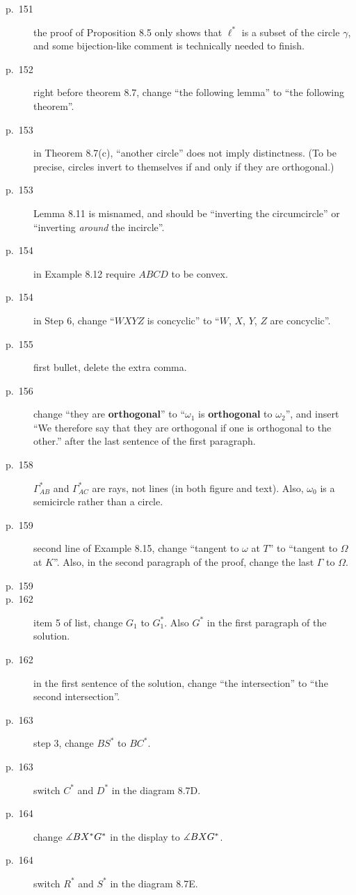 \documentclass[11pt]{scrartcl}
\begin{document}
\begin{description}
\item[p.\  151] the proof of Proposition 8.5 only shows that $\ell^\ast$ is a subset of the circle
  $\gamma$, and some bijection-like comment is technically needed to finish.
\item[p.\  152] right before theorem 8.7,
  change ``the following lemma'' to ``the following theorem''.
\item[p.\  153] in Theorem 8.7(c), ``another circle'' does not imply distinctness.
  (To be precise, circles invert to themselves if and only if they are orthogonal.)
\item[p.\  153] Lemma 8.11 is misnamed, and should be ``inverting the circumcircle''
  or ``inverting \emph{around} the incircle''.
\item[p.\  154] in Example 8.12 require $ABCD$ to be convex.
\item[p.\  154] in Step 6, change ``$WXYZ$ is concyclic'' to ``$W$, $X$, $Y$, $Z$ are concyclic''.
\item[p.\  155] first bullet, delete the extra comma.
\item[p.\  156] change ``they are \textbf{orthogonal}'' to ``$\omega_1$ is \textbf{orthogonal} to $\omega_2$'',
  and insert ``We therefore say that they are orthogonal if one is orthogonal to the other.'' after the last sentence of the first paragraph.
\item[p.\  158] $\Gamma_{AB}^\ast$ and $\Gamma_{AC}^\ast$ are rays, not lines (in both figure and text).
  Also, $\omega_0$ is a semicircle rather than a circle.
\item[p.\  159] second line of Example 8.15,
  change ``tangent to $\omega$ at $T$'' to ``tangent to $\Omega$ at $K$''.
  Also, in the second paragraph of the proof, change the last $\Gamma$ to $\Omega$.
\item[p.\  159] 
\item[p.\  162] item 5 of list, change $G_1$ to $G_1^\ast$.
  Also $G^\ast$ in the first paragraph of the solution.
\item[p.\  162] in the first sentence of the solution,
  change ``the intersection'' to ``the second intersection''.
\item[p.\  163] step 3, change $BS^\ast$ to $BC^\ast$.
\item[p.\  163] switch $C^\ast$ and $D^\ast$ in the diagram 8.7D.
\item[p.\  164] change $\measuredangle BX^\ast G^\ast$ in the display to $\measuredangle BXG^\ast$.
\item[p.\  164] switch $R^\ast$ and $S^\ast$ in the diagram 8.7E.

\end{description}
\end{document}
